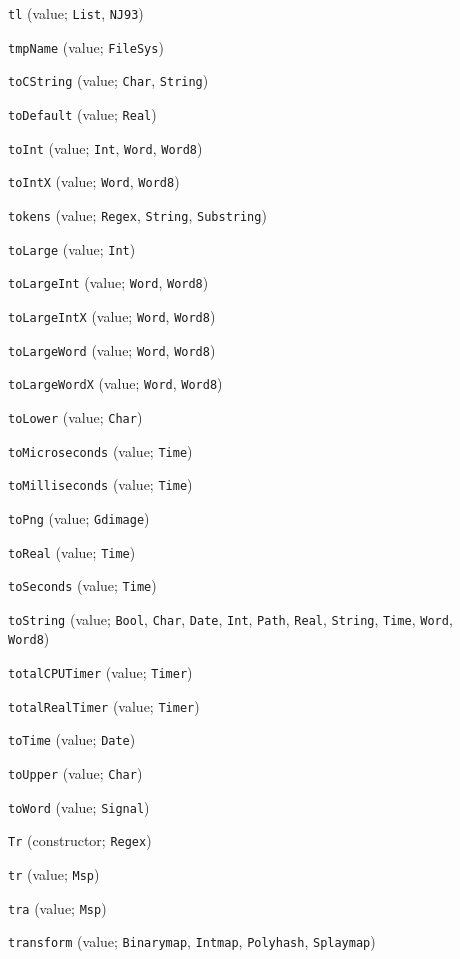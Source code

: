 \begin{description}
\item[] \verb"tl" (value; \verb"List", \verb"NJ93")
\item[] \verb"tmpName" (value; \verb"FileSys")
\item[] \verb"toCString" (value; \verb"Char", \verb"String")
\item[] \verb"toDefault" (value; \verb"Real")
\item[] \verb"toInt" (value; \verb"Int", \verb"Word", \verb"Word8")
\item[] \verb"toIntX" (value; \verb"Word", \verb"Word8")
\item[] \verb"tokens" (value; \verb"Regex", \verb"String", \verb"Substring")
\item[] \verb"toLarge" (value; \verb"Int")
\item[] \verb"toLargeInt" (value; \verb"Word", \verb"Word8")
\item[] \verb"toLargeIntX" (value; \verb"Word", \verb"Word8")
\item[] \verb"toLargeWord" (value; \verb"Word", \verb"Word8")
\item[] \verb"toLargeWordX" (value; \verb"Word", \verb"Word8")
\item[] \verb"toLower" (value; \verb"Char")
\item[] \verb"toMicroseconds" (value; \verb"Time")
\item[] \verb"toMilliseconds" (value; \verb"Time")
\item[] \verb"toPng" (value; \verb"Gdimage")
\item[] \verb"toReal" (value; \verb"Time")
\item[] \verb"toSeconds" (value; \verb"Time")
\item[] \verb"toString" (value; \verb"Bool", \verb"Char", \verb"Date", \verb"Int", \verb"Path", \verb"Real", \verb"String", \verb"Time", \verb"Word", \verb"Word8")
\item[] \verb"totalCPUTimer" (value; \verb"Timer")
\item[] \verb"totalRealTimer" (value; \verb"Timer")
\item[] \verb"toTime" (value; \verb"Date")
\item[] \verb"toUpper" (value; \verb"Char")
\item[] \verb"toWord" (value; \verb"Signal")
\item[] \verb"Tr" (constructor; \verb"Regex")
\item[] \verb"tr" (value; \verb"Msp")
\item[] \verb"tra" (value; \verb"Msp")
\item[] \verb"transform" (value; \verb"Binarymap", \verb"Intmap", \verb"Polyhash", \verb"Splaymap")

\end{description}
